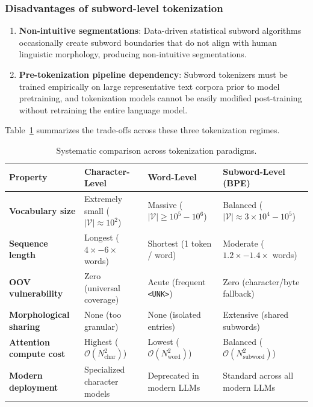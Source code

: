 \documentclass[../../main.tex]{subfiles}
\begin{document}
\subsubsection{Disadvantages of subword-level tokenization}
\begin{enumerate}
    \item \textbf{Non-intuitive segmentations}: Data-driven statistical subword algorithms occasionally create subword boundaries that do not align with human linguistic morphology, producing non-intuitive segmentations.
    \item \textbf{Pre-tokenization pipeline dependency}: Subword tokenizers must be trained empirically on large representative text corpora prior to model pretraining, and tokenization models cannot be easily modified post-training without retraining the entire language model.
\end{enumerate}

Table~\ref{tab:tokenization_comparison_spectrum} summarizes the trade-offs across these three tokenization regimes.

\begin{table}[htbp]
\centering
\small
\caption{Systematic comparison across tokenization paradigms.}
\label{tab:tokenization_comparison_spectrum}
\begin{tabularx}{\textwidth}{lXXX}
\toprule
\textbf{Property} & \textbf{Character-Level} & \textbf{Word-Level} & \textbf{Subword-Level (BPE)} \\
\midrule
\textbf{Vocabulary size} & Extremely small ($|\mathcal{V}| \approx 10^2$) & Massive ($|\mathcal{V}| \ge 10^5 - 10^6$) & Balanced ($|\mathcal{V}| \approx 3 \times 10^4 - 10^5$) \\
\textbf{Sequence length} & Longest ($4\times - 6\times$ words) & Shortest (1 token / word) & Moderate ($1.2\times - 1.4\times$ words) \\
\textbf{OOV vulnerability} & Zero (universal coverage) & Acute (frequent \texttt{<UNK>}) & Zero (character/byte fallback) \\
\textbf{Morphological sharing} & None (too granular) & None (isolated entries) & Extensive (shared subwords) \\
\textbf{Attention compute cost} & Highest ($\mathcal{O}(N_{\text{char}}^2)$) & Lowest ($\mathcal{O}(N_{\text{word}}^2)$) & Balanced ($\mathcal{O}(N_{\text{subword}}^2)$) \\
\textbf{Modern deployment} & Specialized character models & Deprecated in modern LLMs & Standard across all modern LLMs \\
\bottomrule
\end{tabularx}
\end{table}
\end{document}
